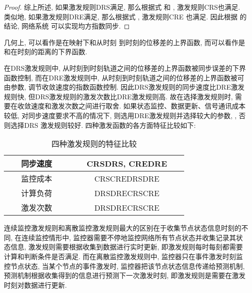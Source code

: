 \begin{proof}
        综上所述, 如果激发规则DRS满足, 那么根据式  和 , 激发规则CRS也满足. 类似地, 如果激发规则DRE满足, 那么根据式 , 激发规则CRE 也满足. 因此根据 的结论, 网络系统  可以实现均方指数同步.
        \end{proof}
        \begin{rem}
        几何上, 可以看作是在映射下和从时刻 到时刻的位移差的上界函数, 而可以看作是和在时刻的距离的下界函数.
        \end{rem}
        \begin{rem}
        在DRS激发规则中, 从时刻到时刻轨道之间的位移差的上界函数被同步误差的下界函数控制, 而在DRE激发规则中, 从时刻到时刻轨道之间的位移差的上界函数被可由参数, 调节收敛速度的指数函数控制. 因此DRS激发规则的同步速度比DRE激发规则快, 但DRS激发规则的激发次数比DRE激发规则高. 故在选择激发规则时, 需要在收敛速度和激发次数之间进行取舍. 如果状态监控、数据更新、信号通讯成本较低, 对同步速度要求不高的情况下, 则选用DRE激发规则并选择较大的参数, , 否则选择DRS 激发规则较好.
        四种激发函数的各方面特征比较如下:
        \end{rem}
\begin{table}[!hbp]
\setlength{\abovecaptionskip}{-1pt}
\setlength{\belowcaptionskip}{-1pt}
\caption{四种激发规则的特征比较}\label{table11}
\begin{center}
\begin{tabular}{|c|c|}
\hline
~~~同步速度~~~ & ~~~CRSDRS, CREDRE~~~\\
\hline
~~~监控成本~~~ & ~~~CRSCREDRSDRE~~~\\
\hline
~~~计算负荷~~~ & ~~~DRSDRECRSCRE~~~\\
\hline
~~~激发次数~~~ & ~~~DRSDRECRSCRE~~~\\
\hline
\end{tabular}
\end{center}
\end{table}
        \begin{rem}
        连续监控激发规则和离散监控激发规则最大的区别在于收集节点状态信息时刻的不同, 在连续监控情形中, 监控器需要不停地监控网络所有节点状态并收集记录其状态信息, 激发规则需要根据收集到数据进行实时更新, 即激发规则每时每刻都需要计算和判断条件是否满足. 而在离散监控激发规则中, 监控器只在事件激发时刻监控节点状态, 当某个节点的事件激发时, 监控器把该节点状态信息传递给预测机制, 预测机制根据收集得到的信息进行预测下一次激发时刻, 即激发规则是需要在激发时刻对数据进行更新.
        \end{rem}
